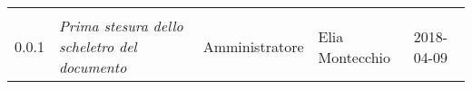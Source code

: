 \newpage 
\section*{}
\begin{table}[H]
	\centering
	\begin{tabular}{C{2cm}|C{4cm}|C{3cm}|C{3cm}|R{2cm}}
		
		 & & & & \\
		
		

		
		
		0.0.1 & \emph{Prima stesura dello scheletro del documento} & Amministratore & Elia Montecchio &  2018-04-09 \\
		
		
	\end{tabular}
	
\end{table}


\clearpage